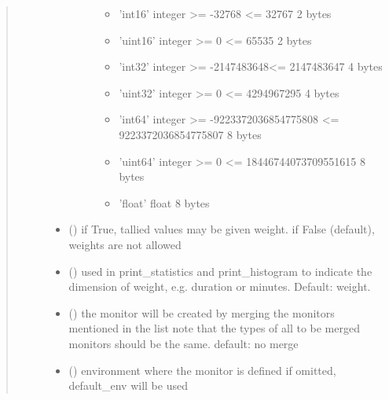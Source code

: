 \documentclass[letterpaper,10pt,english]{sphinxmanual}
\begin{document}
\begin{fulllineitems}
\begin{quote}
\begin{description}
\begin{itemize}
\begin{description}
\begin{itemize}
\item {} 
’int16’ integer \textgreater{}= -32768 \textless{}= 32767 2 bytes

\item {} 
’uint16’ integer \textgreater{}= 0 \textless{}= 65535 2 bytes

\item {} 
’int32’ integer \textgreater{}= -2147483648\textless{}= 2147483647 4 bytes

\item {} 
’uint32’ integer \textgreater{}= 0 \textless{}= 4294967295 4 bytes

\item {} 
’int64’ integer \textgreater{}= -9223372036854775808 \textless{}= 9223372036854775807 8 bytes

\item {} 
’uint64’ integer \textgreater{}= 0 \textless{}= 18446744073709551615 8 bytes

\item {} 
’float’ float 8 bytes

\end{itemize}

\end{description}


\item {} 
 () \textendash{} if True, tallied values may be given weight.
if False (default), weights are not allowed

\item {} 
 () \textendash{} used in print\_statistics and print\_histogram to indicate the dimension of weight,
e.g. duration or minutes. Default: weight.

\item {} 
 (\sphinxstyleliteralemphasis{, }) \textendash{} the monitor will be created by merging the monitors mentioned in the list 
note that the types of all to be merged monitors should be the same. 
default: no merge

\item {} 
 ({\hyperref[\detokenize{Reference:salabim.Environment}]{}}) \textendash{} environment where the monitor is defined 
if omitted, default\_env will be used


\end{itemize}
\end{description}
\end{quote}
\end{fulllineitems}
\end{document}

